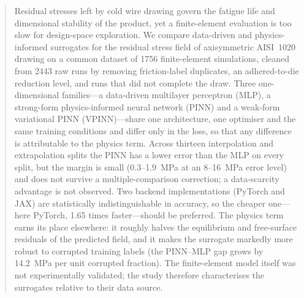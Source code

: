 \documentclass[subscriptcorrection,upint,varvw,barcolor=Goldenrod3,mathalfa=cal=euler,balance,hyphenate,french,pdf-a]{asmejour} %
\begin{document}
   
\begin{abstract}
Residual stresses left by cold wire drawing govern the fatigue life and dimensional stability of the product, yet a finite-element evaluation is too slow for design-space exploration. We compare data-driven and physics-informed surrogates for the residual stress field of axisymmetric AISI~1020 drawing on a common dataset of 1756 finite-element simulations, cleaned from 2443 raw runs by removing friction-label duplicates, an adhered-to-die reduction level, and runs that did not complete the draw. Three one-dimensional families---a data-driven multilayer perceptron (MLP), a strong-form physics-informed neural network (PINN) and a weak-form variational PINN (VPINN)---share one architecture, one optimiser and the same training conditions and differ only in the loss, so that any difference is attributable to the physics term. Across thirteen interpolation and extrapolation splits the PINN has a lower error than the MLP on every split, but the margin is small (0.3--1.9~MPa at an 8--16~MPa error level) and does not survive a multiple-comparison correction; a data-scarcity advantage is not observed. Two backend implementations (PyTorch and JAX) are statistically indistinguishable in accuracy, so the cheaper one---here PyTorch, 1.65 times faster---should be preferred. The physics term earns its place elsewhere: it roughly halves the equilibrium and free-surface residuals of the predicted field, and it makes the surrogate markedly more robust to corrupted training labels (the PINN--MLP gap grows by 14.2~MPa per unit corrupted fraction). The finite-element model itself was not experimentally validated; the study therefore characterises the surrogates relative to their data source.
\end{abstract}


\date{Version \versionno, \today}%

\maketitle %
\end{document}
